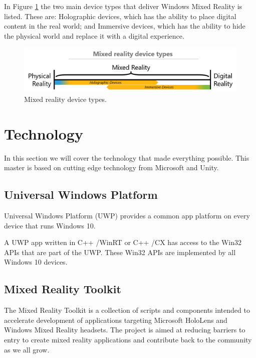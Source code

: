    In Figure \ref{fig:mrdevicetypes} the two main device types that deliver Windows Mixed Reality is listed. These are: Holographic devices, which has the ability to place digital content in the real world;\cite{wdc-mr} and Immersive devices, which has the ability to hide the physical world and replace it with a digital experience.\cite{wdc-mr} 
    \begin{figure}[h!]
        \centering
        \includegraphics[scale=1]{figures/mixedrealityspectrumdevicetypes.png}
        \caption{Mixed reality device types.\cite{wdc-mr}}
        \label{fig:mrdevicetypes}
    \end{figure}

\section{Technology}
In this section we will cover the technology that made everything possible. This master is based on cutting edge technology from Microsoft and Unity.

    \subsection{Universal Windows Platform}
    Universal Windows Platform (UWP) provides a common app platform on every device that runs Windows 10. 

    A UWP app written in C++ /WinRT or C++ /CX has access to the Win32 APIs that are part of the UWP. These Win32 APIs are implemented by all Windows 10 devices.
    
    \subsection{Mixed Reality Toolkit}
    The Mixed Reality Toolkit is a collection of scripts and components intended to accelerate development of applications targeting Microsoft HoloLens and Windows Mixed Reality headsets. The project is aimed at reducing barriers to entry to create mixed reality applications and contribute back to the community as we all grow. %

